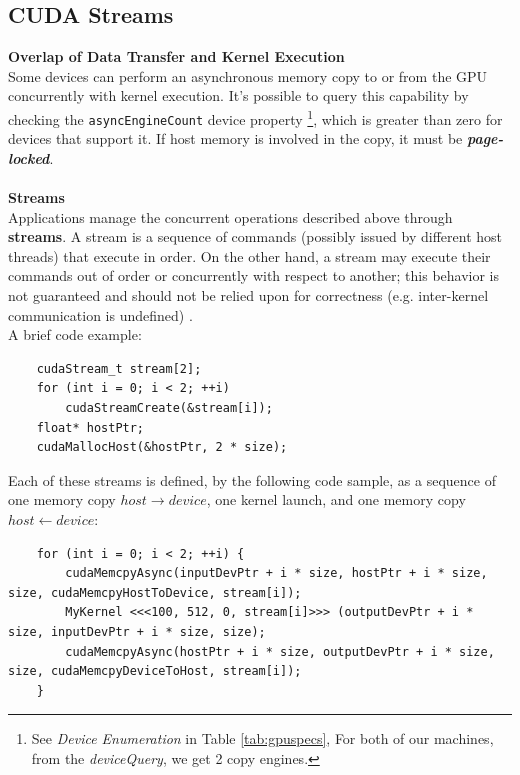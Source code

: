 	\subsection{CUDA Streams}
	\label{subs:streams} 
	\textbf{Overlap of Data Transfer and Kernel Execution}\\
	Some devices can perform an asynchronous memory copy to or from the GPU	concurrently with kernel execution. 
	It's possible to query this capability by checking the \texttt{asyncEngineCount} device property \footnote{ See \textit{Device Enumeration} in Table \ref{tab:gpuspecs}, For both of our machines, from the \textit{deviceQuery}, we get 2 copy engines.}, which is greater than zero for devices that support it. If host memory is involved in the copy, it must be
	\textit{\textbf{page-locked}}.\\\\
	\Large \textbf{Streams}\normalsize\\
	Applications manage the concurrent operations described above through \textbf{streams}. A stream is a sequence of commands (possibly issued by different host threads) that execute in order. On the other hand, a stream may execute their commands out of order or concurrently with respect to another; this behavior is not guaranteed and	should not be relied upon for correctness (e.g. inter-kernel communication is undefined) \cite{cudaguide}.\\
	A brief code example:
	\begin{lstlisting}
	cudaStream_t stream[2];
	for (int i = 0; i < 2; ++i)
		cudaStreamCreate(&stream[i]);
	float* hostPtr;
	cudaMallocHost(&hostPtr, 2 * size);
	\end{lstlisting}	

	Each of these streams is defined, by the following code sample, as a sequence of one memory copy \(host \rightarrow device\), one kernel launch, and one memory copy \(host \leftarrow device\):
	\begin{lstlisting}
	for (int i = 0; i < 2; ++i) {
		cudaMemcpyAsync(inputDevPtr + i * size, hostPtr + i * size, size, cudaMemcpyHostToDevice, stream[i]);
		MyKernel <<<100, 512, 0, stream[i]>>> (outputDevPtr + i * size, inputDevPtr + i * size, size);
		cudaMemcpyAsync(hostPtr + i * size, outputDevPtr + i * size, size, cudaMemcpyDeviceToHost, stream[i]);
	}
	\end{lstlisting}
	
